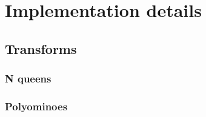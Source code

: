 
\chapter{Implementation details}
\label{implementation}




\section{Transforms}


\subsection{N queens}




\subsection{Polyominoes}


